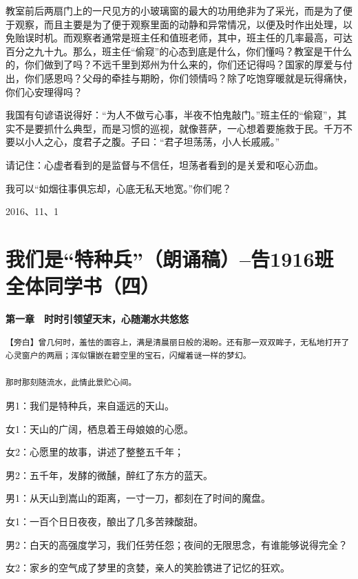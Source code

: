 \documentclass[openany]{ctexbook}
\begin{document}
教室前后两扇门上的一尺见方的小玻璃窗的最大的功用绝非为了采光，而是为了便于观察，而且主要是为了便于观察里面的动静和异常情况，以便及时作出处理，以免贻误时机。而观察者通常是班主任和值班老师，其中，班主任的几率最高，可达百分之九十九。那么，班主任``偷窥''的心态到底是什么，你们懂吗？教室是干什么的，你们做到了吗？不远千里到郑州为什么来的，你们还记得吗？国家的厚爱与付出，你们感恩吗？父母的牵挂与期盼，你们领情吗？除了吃饱穿暖就是玩得痛快，你们心安理得吗？

我国有句谚语说得好：``为人不做亏心事，半夜不怕鬼敲门。''班主任的``偷窥''，其实不是要抓什么典型，而是习惯的巡视，就像菩萨，一心想着要施救于民。千万不要以小人之心，度君子之腹。子曰：``君子坦荡荡，小人长戚戚。''

请记住：心虚者看到的是监督与不信任，坦荡者看到的是关爱和呕心沥血。

我可以``如烟往事俱忘却，心底无私天地宽。''你们呢？

2016、11、1

\chapter*{\texorpdfstring{我们是``特种兵''（朗诵稿）--告1916班全体同学书（四）}{我们是特种兵（朗诵稿）--告1916班全体同学书（四）}}\label{letter4}

\textbf{第一章　时时引领望天末，心随潮水共悠悠}

\begin{verbatim}
【旁白】曾几何时，羞怯的面容上，满是清晨丽日般的渴盼。还有那一双双眸子，无私地打开了心灵窗户的两扇；浑似镶嵌在碧空里的宝石，闪耀着谜一样的梦幻。

那时那刻随流水，此情此景贮心间。
\end{verbatim}

男1：我们是特种兵，来自遥远的天山。

女1：天山的广阔，栖息着王母娘娘的心愿。

女2：心愿里的故事，讲述了整整五千年；

男2：五千年，发酵的微醺，醉红了东方的蓝天。

男1：从天山到嵩山的距离，一寸一刀，都刻在了时间的魔盘。

女1：一百个日日夜夜，酿出了几多苦辣酸甜。

男2：白天的高强度学习，我们任劳任怨；夜间的无限思念，有谁能够说得完全？

女2：家乡的空气成了梦里的贪婪，亲人的笑脸镌进了记忆的狂欢。
\end{document}

